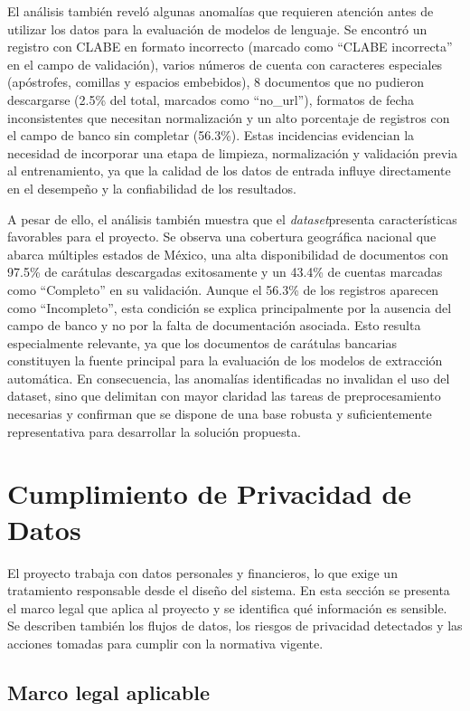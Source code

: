 El análisis también reveló algunas anomalías que requieren atención antes de utilizar los datos para la evaluación de modelos de lenguaje. Se encontró un registro con CLABE en formato incorrecto (marcado como ``CLABE incorrecta'' en el campo de validación), varios números de cuenta con caracteres especiales (apóstrofes, comillas y espacios embebidos), 8 documentos que no pudieron descargarse (2.5\% del total, marcados como ``no\_url''), formatos de fecha inconsistentes que necesitan normalización y un alto porcentaje de registros con el campo de banco sin completar (56.3\%). Estas incidencias evidencian la necesidad de incorporar una etapa de limpieza, normalización y validación previa al entrenamiento, ya que la calidad de los datos de entrada influye directamente en el desempeño y la confiabilidad de los resultados.


A pesar de ello, el análisis también muestra que el \textit{dataset}presenta características favorables para el proyecto. Se observa una cobertura geográfica nacional que abarca múltiples estados de México, una alta disponibilidad de documentos con 97.5\% de carátulas descargadas exitosamente y un 43.4\% de cuentas marcadas como ``Completo'' en su validación. Aunque el 56.3\% de los registros aparecen como ``Incompleto'', esta condición se explica principalmente por la ausencia del campo de banco y no por la falta de documentación asociada. Esto resulta especialmente relevante, ya que los documentos de carátulas bancarias constituyen la fuente principal para la evaluación de los modelos de extracción automática. En consecuencia, las anomalías identificadas no invalidan el uso del dataset, sino que delimitan con mayor claridad las tareas de preprocesamiento necesarias y confirman que se dispone de una base robusta y suficientemente representativa para desarrollar la solución propuesta.


\section{Cumplimiento de Privacidad de Datos}

El proyecto trabaja con datos personales y financieros, lo que exige un tratamiento responsable desde el diseño del sistema. En esta sección se presenta el marco legal que aplica al proyecto y se identifica qué información es sensible. Se describen también los flujos de datos, los riesgos de privacidad detectados y las acciones tomadas para cumplir con la normativa vigente.

\subsection{Marco legal aplicable}

